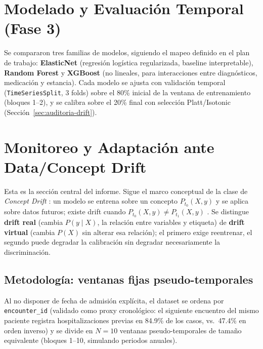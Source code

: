 \documentclass[11pt,a4paper]{article}
\begin{document}
\section{Modelado y Evaluación Temporal (Fase 3)}
\label{sec:modelado}

Se compararon tres familias de modelos, siguiendo el mapeo definido en el plan de trabajo: \textbf{ElasticNet} (regresión logística regularizada, baseline interpretable), \textbf{Random Forest} y \textbf{XGBoost} (no lineales, para interacciones entre diagnósticos, medicación y estancia). Cada modelo se ajusta con validación temporal (\texttt{TimeSeriesSplit}, 3 folds) sobre el 80\% inicial de la ventana de entrenamiento (bloques 1--2), y se calibra sobre el 20\% final con selección Platt/Isotonic (Sección~\ref{sec:auditoria-drift}).



\section{Monitoreo y Adaptación ante Data/Concept Drift}
\label{sec:drift}

Esta es la sección central del informe. Sigue el marco conceptual de la clase de \emph{Concept Drift} \cite{soriano2026}: un modelo se entrena sobre un concepto $P_{t_0}(X,y)$ y se aplica sobre datos futuros; existe drift cuando $P_{t_0}(X,y) \neq P_{t_1}(X,y)$ \cite{gama2014,widmerkubat1996}. Se distingue \textbf{drift real} (cambia $P(y\mid X)$, la relación entre variables y etiqueta) de \textbf{drift virtual} (cambia $P(X)$ sin alterar esa relación); el primero exige reentrenar, el segundo puede degradar la calibración sin degradar necesariamente la discriminación.

\subsection{Metodología: ventanas fijas pseudo-temporales}

Al no disponer de fecha de admisión explícita, el dataset se ordena por \texttt{encounter\_id} (validado como proxy cronológico: el siguiente encuentro del mismo paciente registra hospitalizaciones previas en 84.9\% de los casos, vs.\ 47.4\% en orden inverso) y se divide en $N=10$ ventanas pseudo-temporales de tamaño equivalente (bloques 1--10, simulando periodos anuales).
\end{document}

